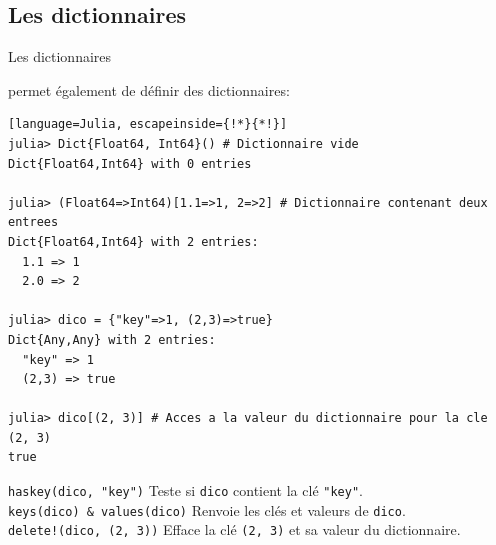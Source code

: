 \subsection{Les dictionnaires}
\begin{frame}[containsverbatim]{Les dictionnaires}
\par{\Julia{} permet également de définir des dictionnaires:}
\begin{lstlisting}[language=Julia, escapeinside={!*}{*!}]
julia> Dict{Float64, Int64}() # Dictionnaire vide
Dict{Float64,Int64} with 0 entries

julia> (Float64=>Int64)[1.1=>1, 2=>2] # Dictionnaire contenant deux entrees
Dict{Float64,Int64} with 2 entries:
  1.1 => 1
  2.0 => 2

julia> dico = {"key"=>1, (2,3)=>true}
Dict{Any,Any} with 2 entries:
  "key" => 1
  (2,3) => true

julia> dico[(2, 3)] # Acces a la valeur du dictionnaire pour la cle (2, 3)
true
\end{lstlisting}
\vspace{-1ex}
\begin{multicols}{2}
    {\small
         \texttt{haskey(dico, "key")} Teste si \texttt{dico} contient la clé \texttt{"key"}.\\
         \texttt{keys(dico) \& values(dico)} Renvoie les clés et valeurs de \texttt{dico}.\\
        \columnbreak
         \texttt{delete!(dico, (2, 3))} Efface la clé \texttt{(2, 3)} et sa valeur du dictionnaire.\\
    }
\end{multicols}
\end{frame}


